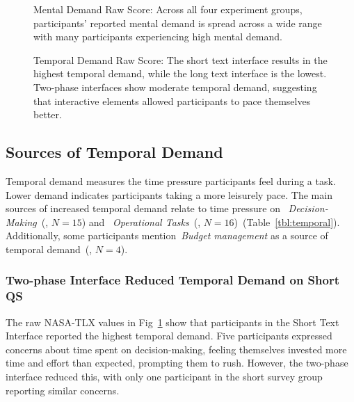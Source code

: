 \begin{figure}[t!]
{\begin{minipage}{0.48\textwidth}
            \vfill
        \end{minipage}
    } 
    \begin{minipage}[t]{0.48\textwidth}
        \caption{Mental Demand Raw Score: Across all four experiment groups, participants' reported mental demand is spread across a wide range with many participants experiencing high mental demand.}
        \label{fig:mental_cog_score}
    \end{minipage}%
    \hfill
    \begin{minipage}[t]{0.48\textwidth}
        \caption{Temporal Demand Raw Score: The short text interface results in the highest temporal demand, while the long text interface is the lowest. Two-phase interfaces show moderate temporal demand, suggesting that interactive elements allowed participants to pace themselves better.}
        \label{fig:temporal_cog_score}
    \end{minipage}
\end{figure}



\subsection{Sources of Temporal Demand} 
\label{sec:temporal}

Temporal demand measures the time pressure participants feel during a task. Lower demand indicates participants taking a more leisurely pace. The main sources of increased temporal demand relate to time pressure on ~\textit{Decision-Making}~(, $N=15$) and ~\textit{Operational Tasks}~(, $N=16$)~(Table~\ref{tbl:temporal}). Additionally, some participants mention~\textit{Budget management} as a source of temporal demand~(, $N=4$).

\subsubsection{Two-phase Interface Reduced Temporal Demand on Short QS} The raw NASA-TLX values in Fig~\ref{fig:temporal_cog_score} show that participants in the Short Text Interface reported the highest temporal demand. Five participants expressed concerns about time spent on decision-making, feeling themselves invested more time and effort than expected, prompting them to rush. However, the two-phase interface reduced this, with only one participant in the short survey group reporting similar concerns.

